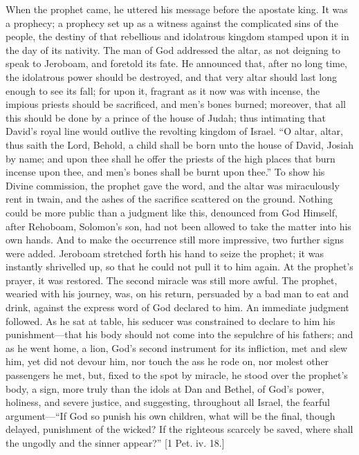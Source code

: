 When the prophet came, he uttered his message before the apostate
king. It was a prophecy; a prophecy set up as a witness against the
complicated sins of the people, the destiny of that rebellious and
idolatrous kingdom stamped upon it in the day of its nativity. The man
of God addressed the altar, as not deigning to speak to Jeroboam, and
foretold its fate. He announced that, after no long time, the
idolatrous power should be destroyed, and that very altar should last
long enough to see its fall; for upon it, fragrant as it now was with
incense, the impious priests should be sacrificed, and men's bones
burned; moreover, that all this should be done by a prince of the
house of Judah; thus intimating that David's royal line would
outlive the revolting kingdom of Israel. ``O altar, altar, thus
saith the Lord, Behold, a child shall be born unto the house of David,
Josiah by name; and upon thee shall he offer the priests of the high
places that burn incense upon thee, and men's bones shall be burnt
upon thee.'' To show his Divine commission, the prophet gave the
word, and the altar was miraculously rent in twain, and the ashes of
the sacrifice scattered on the ground. Nothing could be more public
than a judgment like this, denounced from God Himself, after Rehoboam,
Solomon's son, had not been allowed to take the matter into his own
hands. And to make the occurrence still more impressive, two further
signs were added. Jeroboam stretched forth his hand to seize the
prophet; it was instantly shrivelled up, so that he could not pull it
to him again. At the prophet's prayer, it was restored. The second
miracle was still more awful. The prophet, wearied with his journey,
was, on his return, persuaded by a bad man to eat and drink, against
the express word of God declared to him. An immediate judgment
followed. As he sat at table, his seducer was constrained to declare
to him his punishment—that his body should not come into the
sepulchre of his fathers; and as he went home, a lion, God's second
instrument for its infliction, met and slew him, yet did not devour
him, nor touch the ass he rode on, nor molest other passengers he met,
but, fixed to the spot by miracle, he stood over the prophet's body,
a sign, more truly than the idols at Dan and Bethel, of God's power,
holiness, and severe justice, and suggesting, throughout all Israel,
the fearful argument—``If God so punish his own children, what
will be the final, though delayed, punishment of the wicked? If the
righteous scarcely be saved, where shall the ungodly and the sinner
appear?'' [1 Pet. iv. 18.]

